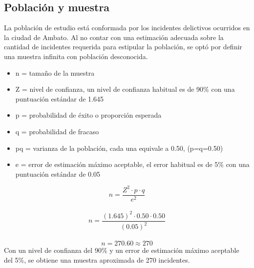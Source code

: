 \subsection{Población y muestra}
La población de estudio está conformada por los incidentes delictivos ocurridos en la ciudad de Ambato. Al no contar con una estimación
adecuada sobre la cantidad de incidentes requerida para estipular la población, se optó por definir una muestra infinita con población desconocida.
\begin{itemize}
    \item n = tamaño de la muestra
    \item Z = nivel de confianza, un nivel de confianza habitual es de 90\% con una puntuación estándar de 1.645
    \item p = probabilidad de éxito o proporción esperada
    \item q = probabilidad de fracaso
    \item pq = varianza de la población, cada una equivale a 0.50, (p=q=0.50)
    \item e = error de estimación máximo aceptable, el error habitual es de 5\% con una puntuación estándar de 0.05
\end{itemize}
\[
    n=\frac{Z^2 \cdot p \cdot q}{e^2}
\]\\
\[
    n=\frac{(1.645)^2 \cdot 0.50 \cdot 0.50}{(0.05)^2}
\]\\
\[
    n=270.60 \approx 270
\]
Con un nivel de confianza del 90\% y un error de estimación máximo aceptable del 5\%, se obtiene una muestra aproximada de 270 incidentes. \\ \\